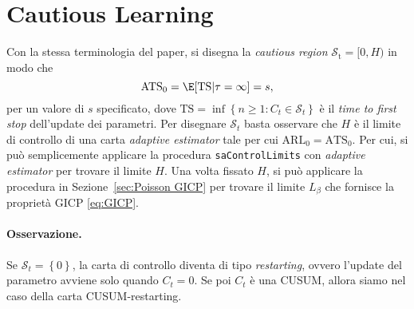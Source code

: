 \documentclass{article}
\begin{document}
\section{Cautious Learning}\label{sec:Cautious Learning}
Con la stessa terminologia del paper, si disegna la \textit{cautious region} $ \mathcal{S}_\text{t} = [0, H)$ in modo che
\[
    \text{ATS}_0 = \E[\text{TS}|\tau = \infty ] = s,
\]
per un valore di $ s$ specificato, dove $ \text{TS} = \inf\left\{ n \ge 1 : C_{t}\in \mathcal{S}_{t} \right\}$ è il \textit{time to first stop} dell'update dei parametri.
Per disegnare $ \mathcal{S}_{t}$ basta osservare che $H$ è il limite di controllo di una carta \textit{adaptive estimator} tale per cui $ \text{ARL}_0 = \text{ATS}_0$.
Per cui, si può semplicemente applicare la procedura \texttt{saControlLimits} con \textit{adaptive estimator} per trovare il limite $ H$.
Una volta fissato $ H$, si può applicare la procedura in Sezione~\ref{sec:Poisson GICP} per trovare il limite $ L_\beta$ che fornisce la proprietà GICP \eqref{eq:GICP}.

\paragraph{Osservazione.} Se $ \mathcal{S}_{t} = \left\{ 0 \right\}$, la carta di controllo diventa di tipo \textit{restarting}, ovvero l'update del parametro avviene solo quando $ C_{t} = 0$.
Se poi $ C_{t}$ è una CUSUM, allora siamo nel caso della carta CUSUM-restarting.



\printbibliography
\end{document}
